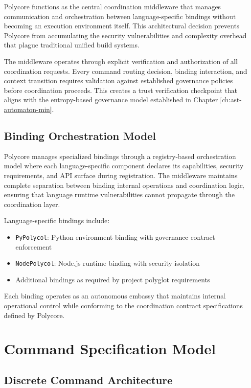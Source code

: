 Polycore functions as the central coordination middleware that manages communication and orchestration between language-specific bindings without becoming an execution environment itself. This architectural decision prevents Polycore from accumulating the security vulnerabilities and complexity overhead that plague traditional unified build systems.

The middleware operates through explicit verification and authorization of all coordination requests. Every command routing decision, binding interaction, and context transition requires validation against established governance policies before coordination proceeds. This creates a trust verification checkpoint that aligns with the entropy-based governance model established in Chapter \ref{ch:ast-automaton-min}.

\subsection{Binding Orchestration Model}

Polycore manages specialized bindings through a registry-based orchestration model where each language-specific component declares its capabilities, security requirements, and API surface during registration. The middleware maintains complete separation between binding internal operations and coordination logic, ensuring that language runtime vulnerabilities cannot propagate through the coordination layer.

Language-specific bindings include:
\begin{itemize}
\item \texttt{PyPolycol}: Python environment binding with governance contract enforcement
\item \texttt{NodePolycol}: Node.js runtime binding with security isolation
\item Additional bindings as required by project polyglot requirements
\end{itemize}

Each binding operates as an autonomous embassy that maintains internal operational control while conforming to the coordination contract specifications defined by Polycore.

\section{Command Specification Model}

\subsection{Discrete Command Architecture}

